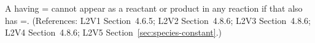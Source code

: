 A \Species having = cannot
appear as a reactant or product in any reaction if that \Species
also has =.  (References: L2V1
Section~4.6.5; L2V2 Section~4.8.6; L2V3 Section~4.8.6; L2V4 Section~4.8.6; L2V5 Section~\ref{sec:species-constant}.)
